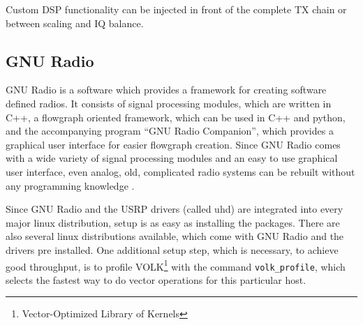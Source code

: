 \documentclass[12pt,a4paper,parskip=full]{scrartcl}
\begin{document}
Custom DSP functionality can be injected in front of the complete TX chain or between
scaling and IQ balance.

\subsection{GNU Radio}
\label{sec:intgnu}
GNU Radio is a software which provides a framework for creating software defined radios. It consists
of signal processing modules, which are written in C++, a flowgraph oriented framework, which can be
used in C++ and python, and the accompanying program ``GNU Radio Companion''\cite{gnuradio_grc},
which provides a graphical user interface for easier flowgraph creation. Since GNU Radio comes
with a wide variety of signal processing modules and an easy to use graphical user interface,
even analog, old, complicated radio systems can be rebuilt without any programming knowledge \cite{isee3}.

Since GNU Radio and the USRP drivers (called uhd) are integrated into every
major linux distribution, setup is as easy as installing the packages. There are
also several linux distributions available, which come with GNU Radio and the drivers
pre installed. One additional setup step, which is necessary, to achieve good throughput,
is to profile VOLK\footnote{Vector-Optimized Library of Kernels} with the command
\verb+volk_profile+, which selects the fastest way to do vector operations for this
particular host\cite{gnuradio_volk}.
\end{document}
